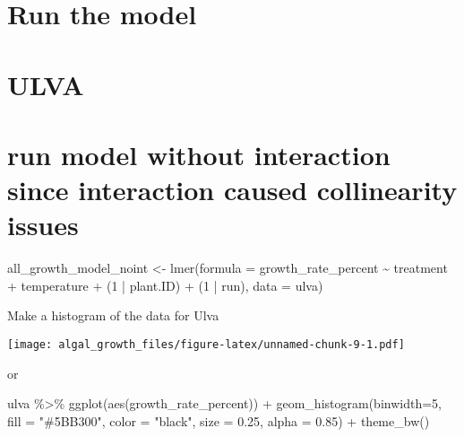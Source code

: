 \documentclass[
]{article}
\newenvironment{Shaded}{\begin{snugshade}}{\end{snugshade}}
\newcommand{\AttributeTok}[1]{\textcolor[rgb]{0.77,0.63,0.00}{#1}}
\newcommand{\ConstantTok}[1]{\textcolor[rgb]{0.00,0.00,0.00}{#1}}
\newcommand{\DecValTok}[1]{\textcolor[rgb]{0.00,0.00,0.81}{#1}}
\newcommand{\FloatTok}[1]{\textcolor[rgb]{0.00,0.00,0.81}{#1}}
\newcommand{\FunctionTok}[1]{\textcolor[rgb]{0.00,0.00,0.00}{#1}}
\newcommand{\NormalTok}[1]{#1}
\newcommand{\OtherTok}[1]{\textcolor[rgb]{0.56,0.35,0.01}{#1}}
\newcommand{\SpecialCharTok}[1]{\textcolor[rgb]{0.00,0.00,0.00}{#1}}
\newcommand{\StringTok}[1]{\textcolor[rgb]{0.31,0.60,0.02}{#1}}
\begin{document}
\hypertarget{run-the-model}{%
\section{Run the model}\label{run-the-model}}

\hypertarget{ulva}{%
\section{ULVA}\label{ulva}}

\hypertarget{run-model-without-interaction-since-interaction-caused-collinearity-issues}{%
\section{run model without interaction since interaction caused
collinearity
issues}\label{run-model-without-interaction-since-interaction-caused-collinearity-issues}}

\begin{Shaded}
\begin{Highlighting}[]
\NormalTok{all\_growth\_model\_noint }\OtherTok{\textless{}{-}} \FunctionTok{lmer}\NormalTok{(}\AttributeTok{formula =}\NormalTok{ growth\_rate\_percent }\SpecialCharTok{\textasciitilde{}}\NormalTok{ treatment }\SpecialCharTok{+}\NormalTok{ temperature }\SpecialCharTok{+} 
\NormalTok{                                 (}\DecValTok{1} \SpecialCharTok{|}\NormalTok{ plant.ID) }\SpecialCharTok{+}\NormalTok{ (}\DecValTok{1} \SpecialCharTok{|}\NormalTok{ run), }\AttributeTok{data =}\NormalTok{ ulva)}
\end{Highlighting}
\end{Shaded}

Make a histogram of the data for Ulva

\begin{Shaded}
\end{Shaded}

\texttt{[image: algal\_growth\_files/figure-latex/unnamed-chunk-9-1.pdf]}

or

\begin{Shaded}
\begin{Highlighting}[]
\NormalTok{ulva }\SpecialCharTok{\%\textgreater{}\%} \FunctionTok{ggplot}\NormalTok{(}\FunctionTok{aes}\NormalTok{(growth\_rate\_percent)) }\SpecialCharTok{+}
  \FunctionTok{geom\_histogram}\NormalTok{(}\AttributeTok{binwidth=}\DecValTok{5}\NormalTok{, }\AttributeTok{fill =} \StringTok{"\#5BB300"}\NormalTok{, }\AttributeTok{color =} \StringTok{"black"}\NormalTok{, }\AttributeTok{size =} \FloatTok{0.25}\NormalTok{, }\AttributeTok{alpha =} \FloatTok{0.85}\NormalTok{) }\SpecialCharTok{+}
  \FunctionTok{theme\_bw}\NormalTok{()}
\end{Highlighting}
\end{Shaded}
\end{document}
